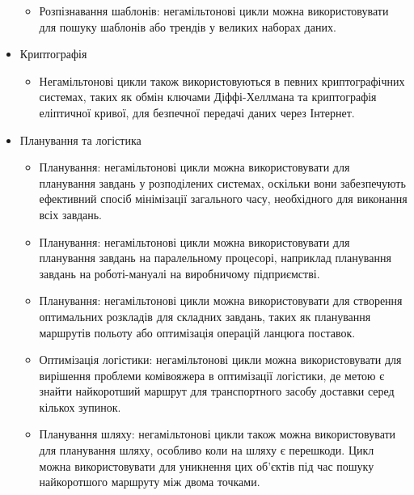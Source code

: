 \documentclass[14pt]{article}
\begin{document}
\begin{spacing}{1.175}
\begin{itemize}
\begin{itemize}
            \item Розпізнавання шаблонів: негамільтонові цикли можна використовувати для пошуку шаблонів або трендів у великих наборах даних.
        
        \end{itemize}


        \item Криптографія
        \begin{itemize}
             
             \item Негамільтонові цикли також використовуються в певних криптографічних системах, таких як обмін ключами Діффі-Хеллмана та криптографія еліптичної кривої, для безпечної передачі даних через Інтернет.
        
        \end{itemize}


        \item Планування та логістика
        \begin{itemize}
            
            \item Планування: негамільтонові цикли можна використовувати для планування завдань у розподілених системах, оскільки вони забезпечують ефективний спосіб мінімізації загального часу, необхідного для виконання всіх завдань.

            \item Планування: негамільтонові цикли можна використовувати для планування завдань на паралельному процесорі, наприклад планування завдань на роботі-мануалі на виробничому підприємстві.
            
            \item Планування: негамільтонові цикли можна використовувати для створення оптимальних розкладів для складних завдань, таких як планування маршрутів польоту або оптимізація операцій ланцюга поставок.
            
            \item Оптимізація логістики: негамільтонові цикли можна використовувати для вирішення проблеми комівояжера в оптимізації логістики, де метою є знайти найкоротший маршрут для транспортного засобу доставки серед кількох зупинок.

            \item Планування шляху: негамільтонові цикли також можна використовувати для планування шляху, особливо коли на шляху є перешкоди. Цикл можна використовувати для уникнення цих об’єктів під час пошуку найкоротшого маршруту між двома точками.


\end{itemize}
\end{itemize}
\end{spacing}
\end{document}
